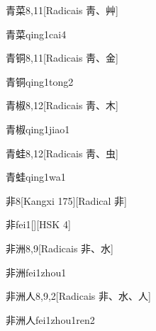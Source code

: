 \begin{entry}{青菜}{8,11}[Radicais ⾭、⾋]
  \begin{phonetics}{青菜}{qing1cai4}
  \end{phonetics}
\end{entry}

\begin{entry}{青铜}{8,11}[Radicais ⾭、⾦]
  \begin{phonetics}{青铜}{qing1tong2}
  \end{phonetics}
\end{entry}

\begin{entry}{青椒}{8,12}[Radicais ⾭、⽊]
  \begin{phonetics}{青椒}{qing1jiao1}
  \end{phonetics}
\end{entry}

\begin{entry}{青蛙}{8,12}[Radicais ⾭、⾍]
  \begin{phonetics}{青蛙}{qing1wa1}
  \end{phonetics}
\end{entry}

\begin{entry}{非}{8}[Kangxi 175][Radical ⾮]
  \begin{phonetics}{非}{fei1}[][HSK 4]
  \end{phonetics}
\end{entry}

\begin{entry}{非洲}{8,9}[Radicais ⾮、⽔]
  \begin{phonetics}{非洲}{fei1zhou1}
  \end{phonetics}
\end{entry}

\begin{entry}{非洲人}{8,9,2}[Radicais ⾮、⽔、⼈]
  \begin{phonetics}{非洲人}{fei1zhou1ren2}
  \end{phonetics}
\end{entry}

